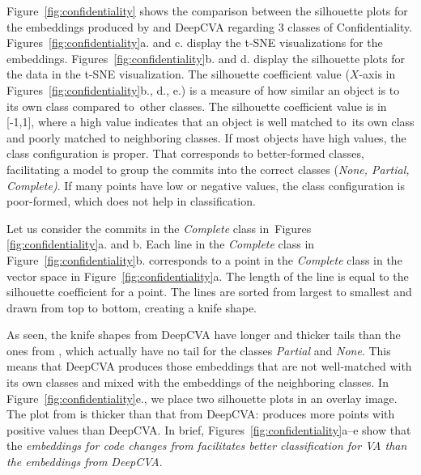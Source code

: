 Figure~\ref{fig:confidentiality} shows the comparison between the
silhouette plots for the embeddings produced by {\tool} and DeepCVA
regarding 3 classes of
Confidentiality. Figures~\ref{fig:confidentiality}a. and c. display
the t-SNE visualizations for the embeddings.
Figures~\ref{fig:confidentiality}b. and d. display the silhouette
plots for the data in the t-SNE visualization.
The silhouette coefficient value ($X$-axis in
Figures~\ref{fig:confidentiality}b., d., e.) is a measure of how
similar an object is to its own class compared to~other classes. The
silhouette coefficient value is in [-1,1], where a high value
indicates that an object is well matched to~its own class and poorly
matched to neighboring classes. If most objects have high values, the
class configuration is proper. That corresponds
to better-formed classes, facilitating a model to group the commits
into the correct classes ({\em None, Partial, Complete)}.
If many points have low or negative values, the
class configuration is poor-formed, which does not help in
classification.

Let us consider the commits in the {\em Complete} class
in~Figures \ref{fig:confidentiality}a. and b. Each line in the {\em
Complete} class in Figure~\ref{fig:confidentiality}b. corresponds to a
point in the {\em Complete} class in the vector space in
Figure~\ref{fig:confidentiality}a. The length of the line is equal to
the silhouette coefficient for a point. The lines are
sorted from largest to smallest and drawn from top to bottom, creating
a knife shape.

As seen, the knife shapes from DeepCVA have longer and thicker
tails than the ones from {\tool}, which actually have no tail for the
classes {\em Partial} and {\em None}. This means that DeepCVA produces
those embeddings that are not well-matched with its own classes and
mixed with the embeddings of the neighboring classes. In
Figure~\ref{fig:confidentiality}e., we place two silhouette plots in
an overlay image. The plot from {\tool} is thicker than that from
DeepCVA: {\tool} produces more points with positive values than
DeepCVA. In brief, Figures~\ref{fig:confidentiality}a--e show that the
{\em embeddings for code changes from {\tool} facilitates better
classification for VA than the embeddings from DeepCVA}.



